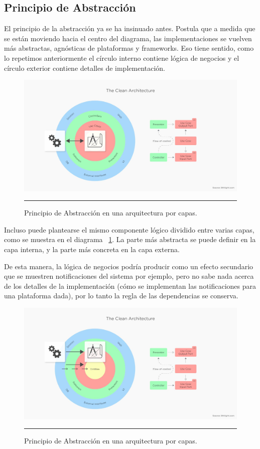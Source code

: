 \subsection{Principio de Abstracción}
El principio de la abstracción ya se ha insinuado antes. Postula que a medida que se están moviendo hacia el centro del diagrama, las implementaciones se vuelven más abstractas, agnósticas de plataformas y frameworks. Eso tiene sentido, como lo repetimos anteriormente el círculo interno contiene lógica de negocios y el círculo exterior contiene detalles de implementación.

\begin{figure}[htbp]
	\centering
	\includegraphics[width=1\textwidth]{Figures/-002.png}
	\rule{35em}{1pt}
	\caption[Abstraction Principle]{Principio de Abstracción en una arquitectura por capas.}
	\label{fig:C2_PA}
\end{figure}

Incluso puede plantearse el mismo componente lógico dividido entre varias capas, como se muestra en el diagrama ~\ref{fig:C2_PA}. La parte más abstracta se puede definir en la capa interna, y la parte más concreta en la capa externa.

De esta manera, la lógica de negocios podría producir como un efecto secundario que se muestren notificaciones del sistema por ejemplo, pero no sabe nada acerca de los detalles de la implementación (cómo se implementan las notificaciones para una plataforma dada), por lo tanto la regla de las dependencias se conserva.


\begin{figure}[htbp]
	\centering
	\includegraphics[width=1\textwidth]{Figures/-003.png}
	\rule{35em}{1pt}
	\caption[Abstraction Principle]{Principio de Abstracción en una arquitectura por capas.}
	\label{fig:C2_PA_02}
\end{figure}

